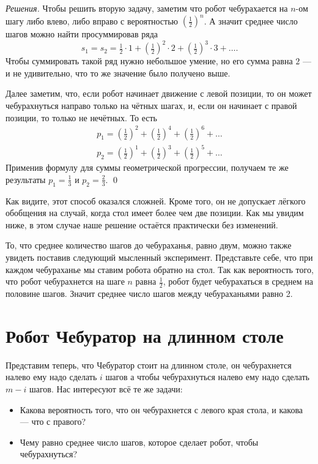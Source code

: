 \documentclass{article}
\begin{document}
\medskip
\noindent\textit{Решения.}
Чтобы решить вторую задачу, 
заметим что робот чебурахается на $n$-ом шагу либо влево, либо вправо с вероятностью $(\tfrac12)^n$.
А значит среднее число шагов можно найти просуммировав ряда
\[s_1=s_2=\tfrac12\cdot1+(\tfrac12)^2\cdot 2+(\tfrac12)^3\cdot 3+\dots.\]
Чтобы суммировать такой ряд нужно небольшое умение, 
но его сумма равна $2$ --- и не удивительно, что то же значение было получено выше.

Далее заметим, что, если робот начинает движение с левой позиции, 
то он может чебурахнуться направо только на чётных шагах, 
и, если он начинает с правой позиции, то только не нечётных.
То есть
\begin{align*}
p_1=(\tfrac12)^2+(\tfrac12)^4+(\tfrac12)^6+\dots
\\
p_2=(\tfrac12)^1+(\tfrac12)^3+(\tfrac12)^5+\dots
\end{align*}
Применив формулу для суммы геометрической прогрессии, получаем те же результаты $p_1=\tfrac13$ и $p_2=\tfrac23$.
\qed
\medskip

Как видите, этот способ оказался сложней.
Кроме того, он не допускает лёгкого обобщения на случай, когда стол имеет более чем две позиции.
Как мы увидим ниже, 
в этом случае наше решение остаётся практически без изменений.

То, что среднее количество шагов до чебураханья,
равно двум, можно также увидеть поставив следующий мысленный эксперимент.
Представьте себе, что при каждом чебураханье 
мы ставим робота обратно на стол.
Так как вероятность того, что робот чебурахнется на шаге $n$
равна $\tfrac12$, робот будет чебурахаться в среднем на половине шагов.
Значит среднее число шагов между чебураханьями равно 2.


\section{Робот Чебуратор на длинном столе} 

Представим теперь, что Чебуратор стоит на длинном столе,
он чебурахнется налево ему надо сделать $i$ шагов
а чтобы чебурахнуться налево ему надо сделать $m-i$ шагов.
Нас интересуют всё те же задачи:

\begin{itemize}
\item Какова вероятность того, что он чебурахнется с левого края стола, и какова --- что с правого?
\item Чему равно среднее число шагов, которое сделает робот, чтобы чебурахнуться?
\end{itemize}
\end{document}
